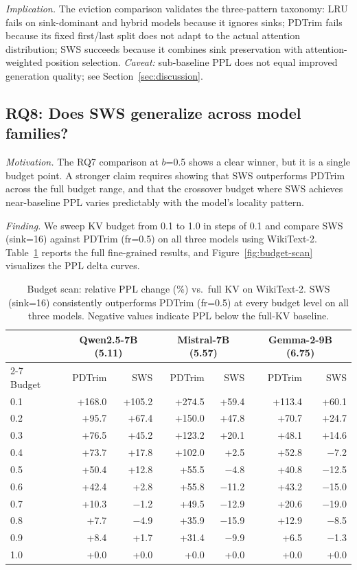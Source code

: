 \documentclass[11pt]{article}
\newcommand{\method}{SWS}
\newcommand{\sws}{SWS}
\theoremstyle{definition}
\theoremstyle{plain}
\begin{document}
\emph{Implication.}  The eviction comparison validates the three-pattern taxonomy: LRU fails on sink-dominant and hybrid models because it ignores sinks; PDTrim fails because its fixed first/last split does not adapt to the actual attention distribution; \sws{} succeeds because it combines sink preservation with attention-weighted position selection.  \emph{Caveat:} sub-baseline PPL does not equal improved generation quality; see Section~\ref{sec:discussion}.

\subsection{RQ8: Does SWS generalize across model families?}
\label{sec:rq8}

\emph{Motivation.}  The RQ7 comparison at $b$=0.5 shows a clear winner, but it is a single budget point.  A stronger claim requires showing that \method{} outperforms PDTrim across the full budget range, and that the crossover budget where \method{} achieves near-baseline PPL varies predictably with the model's locality pattern.

\emph{Finding.}  We sweep KV budget from 0.1 to 1.0 in steps of 0.1 and compare \sws{} (sink=16) against PDTrim (fr=0.5) on all three models using WikiText-2.  Table~\ref{tab:budget-scan} reports the full fine-grained results, and Figure~\ref{fig:budget-scan} visualizes the PPL delta curves.

\begin{table}[t]
\centering
\caption{Budget scan: relative PPL change (\%) vs.\ full KV on WikiText-2.  \sws{} (sink=16) consistently outperforms PDTrim (fr=0.5) at every budget level on all three models.  Negative values indicate PPL below the full-KV baseline.}
\label{tab:budget-scan}
\small
\begin{tabular}{lrr|rr|rr}
\toprule
 & \multicolumn{2}{c|}{Qwen2.5-7B (5.11)} & \multicolumn{2}{c|}{Mistral-7B (5.57)} & \multicolumn{2}{c}{Gemma-2-9B (6.75)} \\
\cmidrule{2-7}
Budget & PDTrim & \sws{} & PDTrim & \sws{} & PDTrim & \sws{} \\
\midrule
0.1 & +168.0 & +105.2 & +274.5 & +59.4 & +113.4 & +60.1 \\
0.2 & +95.7 & +67.4 & +150.0 & +47.8 & +70.7 & +24.7 \\
0.3 & +76.5 & +45.2 & +123.2 & +20.1 & +48.1 & +14.6 \\
0.4 & +73.7 & +17.8 & +102.0 & +2.5 & +52.8 & $-$7.2 \\
0.5 & +50.4 & +12.8 & +55.5 & $-$4.8 & +40.8 & $-$12.5 \\
0.6 & +42.4 & +2.8 & +55.8 & $-$11.2 & +43.2 & $-$15.0 \\
0.7 & +10.3 & $-$1.2 & +49.5 & $-$12.9 & +20.6 & $-$19.0 \\
0.8 & +7.7 & $-$4.9 & +35.9 & $-$15.9 & +12.9 & $-$8.5 \\
0.9 & +8.4 & +1.7 & +31.4 & $-$9.9 & +6.5 & $-$1.3 \\
1.0 & +0.0 & +0.0 & +0.0 & +0.0 & +0.0 & +0.0 \\
\bottomrule
\end{tabular}
\end{table}
\end{document}
